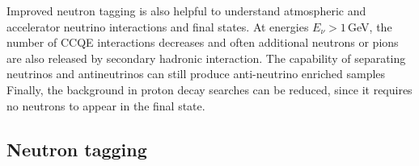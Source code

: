 Improved neutron tagging is also helpful to understand atmospheric and accelerator neutrino interactions and final states.
At energies $E_\nu > 1$\,GeV, the number of CCQE interactions decreases and often additional neutrons or pions %
are also released by secondary hadronic interaction.
The capability of separating neutrinos and antineutrinos can still produce anti-neutrino enriched samples
 Finally, the background in proton decay searches can be reduced, since it requires no neutrons to appear in the final state.


\subsection{Neutron tagging}

